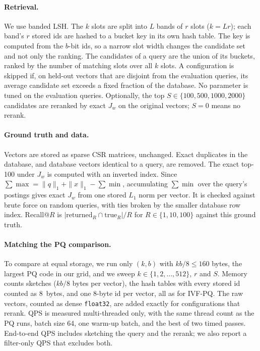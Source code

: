 \documentclass{article}
\begin{document}
\paragraph{Retrieval.}
We use banded LSH. The $k$ slots are split into $L$ bands of $r$ slots
($k=Lr$); each band's $r$ stored ids are hashed to a bucket key in its own hash
table. The key is computed from the $b$-bit ids, so a narrow slot width changes
the candidate set and not only the ranking. The candidates of a query are the
union of its buckets, ranked by the number of matching slots over all $k$ slots.
A configuration is skipped if, on held-out vectors that are disjoint from the
evaluation queries, its average candidate set exceeds a fixed fraction of the
database. No parameter is tuned on the evaluation queries.
Optionally, the top $S\in\{100,500,1000,2000\}$ candidates are reranked by exact
$J_w$ on the original vectors; $S=0$ means no rerank.

\paragraph{Ground truth and data.}
Vectors are stored as sparse CSR matrices, unchanged. Exact duplicates in the
database, and database vectors identical to a query, are removed.
The exact top-100 under $J_w$ is computed with an inverted index. Since
$\sum\max=\|q\|_1+\|x\|_1-\sum\min$, accumulating $\sum\min$ over the query's
postings gives exact $J_w$ from one stored $L_1$ norm per vector. It is checked
against brute force on random queries, with ties broken by the smaller database row index.
Recall@$R$ is $|\text{returned}_{R}\cap\text{true}_{R}|/R$ for $R\in\{1,10,100\}$ against
this ground truth.

\paragraph{Matching the PQ comparison.}
To compare at equal storage, we run only $(k,b)$ with $kb/8\le 160$ bytes, the
largest PQ code in our grid, and we sweep $k\in\{1,2,\dots,512\}$, $r$ and $S$.
Memory counts sketches ($kb/8$ bytes per vector), the hash tables with every
stored id counted as 8~bytes, and one 8-byte id per vector, all as for
IVF-PQ. The raw vectors, counted as dense \texttt{float32}, are added exactly
for configurations that rerank. QPS is measured multi-threaded only, with the same
thread count as the PQ runs, batch size 64, one warm-up batch, and the best of two
timed passes. End-to-end QPS includes sketching the query and the rerank;
we also report a filter-only QPS that excludes both.
\end{document}
